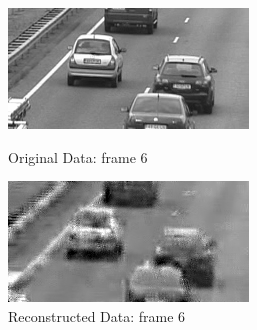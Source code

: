\documentclass[12pt]{article}
\begin{document}
\begin{itemize}
\begin{enumerate}
    \begin{figure}[H]
        \centering
        \begin{minipage}{.45\textwidth}
            \centering
            \includegraphics[width=\linewidth]{results/cars_7_orig_6.png}
            \caption*{Original Data: frame 6}
        \end{minipage}
        \begin{minipage}{.45\textwidth}
            \centering
            \includegraphics[width=\linewidth]{results/cars_7_recon_6.png}
            \caption*{Reconstructed Data: frame 6}
        \end{minipage}
    \end{figure}


\end{enumerate}
\end{itemize}
\end{document}
